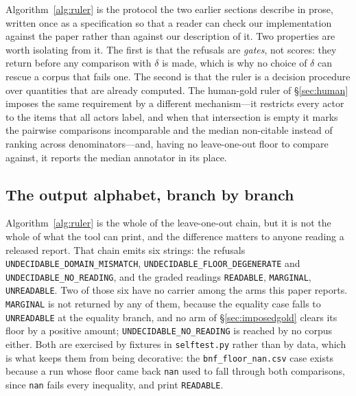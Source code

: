 \documentclass{article}
\newcommand{\ids}[1]{\texttt{\small #1}} %
\begin{document}
Algorithm~\ref{alg:ruler} is the protocol the two earlier sections describe in prose, written once as a specification so that a reader can check our implementation against the paper rather than against our description of it. Two properties are worth isolating from it. The first is that the refusals are \emph{gates}, not scores: they return before any comparison with $\delta$ is made, which is why no choice of $\delta$ can rescue a corpus that fails one. The second is that the ruler is a decision procedure over quantities that are already computed. The human-gold ruler of \S\ref{sec:human} imposes the same requirement by a different mechanism---it restricts every actor to the items that all actors label, and when that intersection is empty it marks the pairwise comparisons incomparable and the median non-citable instead of ranking across denominators---and, having no leave-one-out floor to compare against, it reports the median annotator in its place.

\subsection{The output alphabet, branch by branch}
\label{sec:alphabet} Algorithm~\ref{alg:ruler} is the whole of the leave-one-out chain, but it is not the
whole of what the tool can print, and the difference matters to anyone reading a released report. That
chain emits six strings: the refusals \texttt{UNDECIDABLE\_DOMAIN\_MISMATCH},
\texttt{UNDECIDABLE\_FLOOR\_DEGENERATE} and \texttt{UNDECIDABLE\_NO\_READING}, and the graded readings
\texttt{READABLE}, \texttt{MARGINAL}, \texttt{UNREADABLE}. Two of those six have no carrier among the arms
this paper reports. \texttt{MARGINAL} is not returned by any of them, because the equality case falls to
\texttt{UNREADABLE} at the equality branch, and no arm of \S\ref{sec:imposedgold} clears its floor by a positive amount;
\texttt{UNDECIDABLE\_NO\_READING} is reached by no corpus either. Both are exercised by fixtures in
\ids{selftest.py} rather than by data, which is what keeps them from being decorative: the
\texttt{bnf\_floor\_nan.csv} case exists because a run whose floor came back \texttt{nan} used to fall
through both comparisons, since \texttt{nan} fails every inequality, and print \texttt{READABLE}.
\end{document}
